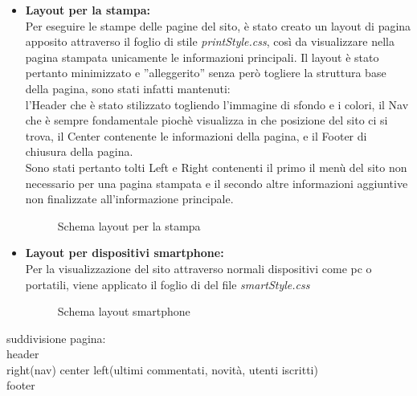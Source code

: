 \begin{itemize}
\item \textbf{Layout per la stampa:}\\
Per eseguire le stampe delle pagine del sito, è stato creato un layout di pagina apposito attraverso il foglio di stile \textit{printStyle.css}, così da visualizzare nella pagina stampata unicamente le informazioni principali. Il layout è stato pertanto minimizzato e ''alleggerito'' senza però togliere la struttura base della pagina, sono stati infatti mantenuti:\\
l'Header che è stato stilizzato togliendo l'immagine di sfondo e i colori, il Nav che è sempre fondamentale piochè visualizza in che posizione del sito ci si trova, il Center contenente le informazioni della pagina, e il Footer di chiusura della pagina.\\
Sono stati pertanto tolti Left e Right contenenti il primo il menù del sito non necessario per una pagina stampata e il secondo altre informazioni aggiuntive non finalizzate all'informazione principale.


 

\begin{center}
\begin{figure}[H]
\centering
\caption{Schema layout per la stampa}
\end{figure}
\end{center}



\item \textbf{Layout per dispositivi smartphone:}\\
Per la visualizzazione del sito attraverso normali dispositivi come pc o portatili, viene applicato il foglio di del file \textit{smartStyle.css} 

\begin{center}
\begin{figure}[H]
\centering
\caption{Schema layout smartphone}
\end{figure}
\end{center}

\end{itemize}



suddivisione pagina:\\
header\\
right(nav) center left(ultimi commentati, novità, utenti iscritti)\\
footer\\


